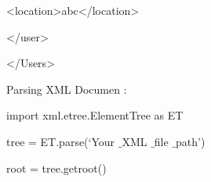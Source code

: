 \documentclass{wileySix}
\begin{document}
\begin{myEnumerate}
\begin{myEnumerate}
{\noindent 
{\fontsize{10pt}{10pt}\selectfont  \hspace*{0.5in}  \hspace*{0.5in} <location>abc</location>} \par
\noindent 
{\fontsize{10pt}{10pt}\selectfont  \hspace*{0.5in} </user>} \par
\noindent 
{\fontsize{10pt}{10pt}\selectfont </Users>} \par
\vspace{10pt}
\noindent 
Parsing XML Documen : \par
\vspace{12pt}
\noindent 
{\fontsize{10pt}{10pt}\selectfont import xml.etree.ElementTree as ET} \par
\noindent 
{\fontsize{10pt}{10pt}\selectfont tree = ET.parse(‘Your $  \_  $XML $  \_  $file $  \_  $path’)} \par
\noindent 
{\fontsize{10pt}{10pt}\selectfont root = tree.getroot()} \par
\noindent 
{\fontsize{10pt}{10pt}\selectfont 	
}\vspace{10pt}

}
\end{myEnumerate}
\end{myEnumerate}
\end{document}
